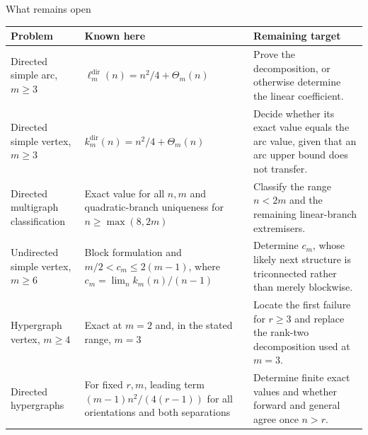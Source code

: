 \documentclass[aspectratio=1610,11pt]{beamer}
\begin{document}
\begin{frame}{What remains open}
\centering
\tiny
\renewcommand{\arraystretch}{1.25}
\begin{tabularx}{\textwidth}{@{}>{\raggedright\arraybackslash}p{}>{\raggedright\arraybackslash}p{}>{\raggedright\arraybackslash}X@{}}
\toprule
Problem & Known here & Remaining target \\
\midrule
Directed simple arc, $m\ge3$ & $\ell_m^{\mathrm{dir}}(n)=n^2/4+\Theta_m(n)$ & Prove the decomposition, or otherwise determine the linear coefficient. \\
Directed simple vertex, $m\ge3$ & $k_m^{\mathrm{dir}}(n)=n^2/4+\Theta_m(n)$ & Decide whether its exact value equals the arc value, given that an arc upper bound does not transfer. \\
Directed multigraph classification & Exact value for all $n,m$ and quadratic-branch uniqueness for $n\ge\max(8,2m)$ & Classify the range $n<2m$ and the remaining linear-branch extremisers. \\
Undirected simple vertex, $m\ge6$ & Block formulation and $m/2<c_m\le2(m-1)$, where $c_m = \lim_n k_m(n)/(n-1)$ & Determine $c_m$, whose likely next structure is triconnected rather than merely blockwise. \\
Hypergraph vertex, $m\ge4$ & Exact at $m=2$ and, in the stated range, $m=3$ & Locate the first failure for $r\ge3$ and replace the rank-two decomposition used at $m=3$. \\
Directed hypergraphs & For fixed $r,m$, leading term $(m-1)n^2/(4(r-1))$ for all orientations and both separations & Determine finite exact values and whether forward and general agree once $n>r$. \\
\bottomrule
\end{tabularx}
\end{frame}
\end{document}
